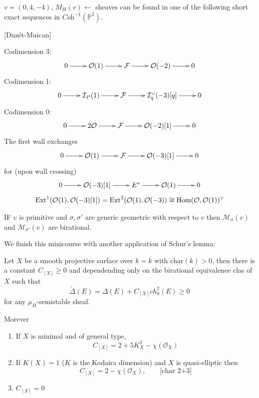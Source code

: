 \begin{example}
\label{example-}
$v=(0,4,-4)$, $M_H(v)\leftarrow$ sheaves can be found in one of the following
short exact sequences in $\textit{Coh}^{-1}(\mathbb{P}^2)$.

[Duzét-Muican]

\noindent
Codimension 3:
$$
\xymatrix{
0\ar[r]&\mathcal{O}(1)\ar[r]&\mathcal{F}\ar[r]&\mathcal{O}(-2)\ar[r]&0
}
$$
Codimension 1:
$$
\xymatrix{
0\ar[r]&\mathcal{I}_P(1)\ar[r]&\mathcal{F}\ar[r]
&\mathcal{I}_q^\vee(-3)[q]\ar[r]&0
}
$$
Codimension 0:
$$
\xymatrix{
0\ar[r]&2\mathcal{O}\ar[r]&\mathcal{F}\ar[r]&\mathcal{O}(-2)[1]\ar[r]&0
}
$$
The first wall exchanges
$$
\xymatrix{
0\ar[r]&\mathcal{O}(1)\ar[r]&\mathcal{F}\ar[r]&\mathcal{O}(-3)[1]\ar[r]&0
}
$$
for (upon wall crossing)
$$
\xymatrix{
0\ar[r]&\mathcal{O}(-3)[1]\ar[r]&E^*\ar[r]&\mathcal{O}(1)\ar[r]&0
}
$$
\begin{align*}
\text{Ext}^1(\mathcal{O}(1),\mathcal{O}(-3)[1])
=\text{Ext}^2(\mathcal{O}(1),\mathcal{O}(-3))
\cong \mathop{\mathrm{Hom}}\nolimits(\mathcal{O},\mathcal{O}(1))^\vee
\end{align*}
\end{example}

\begin{theorem}[Li-Zhao]
\label{theorem-Li-Zhao}
IF $v$ is primitive and $\sigma,\sigma'$ are generic geometric
 with respect to $ v$ then
$\mathcal{M}_{\sigma}(v)$ and $\mathcal{M}_{\sigma'}(v)$ are birational.
\end{theorem}

\medskip\noindent
We finish this minicourse with another application of Schur's lemma:

\begin{theorem}[Koseki]
\label{theorem-Koseki}
Let $X$ be a smooth projective surface over $k=\overline{k}$ with
$\text{char}(k)>0$, then there is a constant $C_{[X]}\geq 0$ and dependending
only on the birational equivalence clas of $X$ such that
$$
\tilde{\Delta}(E)=\Delta(E)+C_{[X]}ch_0^2(E)\geq 0
$$
for any $\mu_H$-semistable sheaf.
\end{theorem}

Morever
\begin{enumerate}
\item If $X$ is minimal and of general type,
$$
C_{[X]}=2+5K_X^2-\chi(\mathcal{O}_X)
$$
\item If $K(X)=1$ ($K$ is the Kodaira dimension) and $X$ is quasi-elliptic then
$$
C_{[X]}=2-\chi(\mathcal{O}_X),\qquad \text{[char 2+3]}
$$
\item $C_{[X]}=0$
\end{enumerate}

